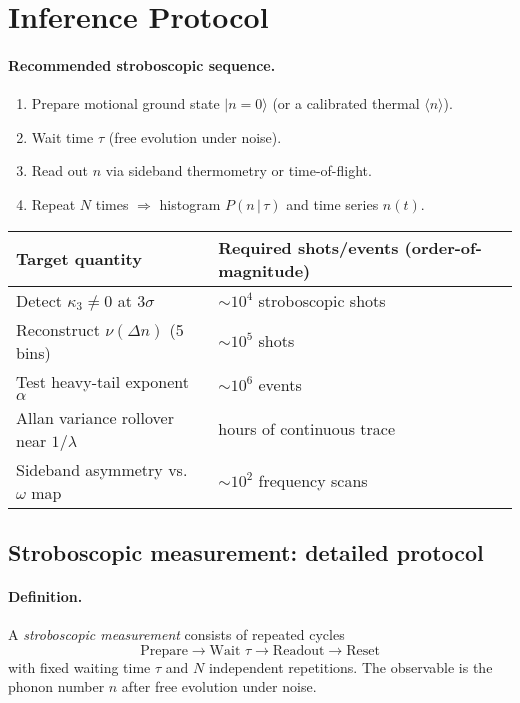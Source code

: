 \section{Inference Protocol}
\label{sec:inference-protocol}
\label{sec:inference_protocol}
\paragraph{Recommended stroboscopic sequence.}
\begin{enumerate}\itemsep0.2em
  \item Prepare motional ground state $\lvert n=0\rangle$ (or a calibrated thermal $\langle n\rangle$).
  \item Wait time $\tau$ (free evolution under noise).
  \item Read out $n$ via sideband thermometry or time-of-flight.
  \item Repeat $N$ times $\Rightarrow$ histogram $P(n\,|\,\tau)$ and time series $n(t)$.
\end{enumerate}

\begin{table}[h]
  \centering
  \renewcommand{\arraystretch}{1.15}
  \begin{tabularx}{0.9\textwidth}{>{\raggedright\arraybackslash}X>{\raggedleft\arraybackslash}p{4.2cm}}
    \hline
    \textbf{Target quantity} & \textbf{Required shots/events (order-of-magnitude)} \\
    \hline
    Detect $\kappa_3 \neq 0$ at $3\sigma$ & $\sim 10^4$ stroboscopic shots \\
    Reconstruct $\nu(\Delta n)$ (5 bins)  & $\sim 10^5$ shots \\
    Test heavy-tail exponent $\alpha$      & $\sim 10^6$ events \\
    Allan variance rollover near $1/\lambda$ & hours of continuous trace \\
    Sideband asymmetry vs.\ $\omega$ map   & $\sim 10^2$ frequency scans \\
    \hline
  \end{tabularx}
\end{table}

\subsection{Stroboscopic measurement: detailed protocol}
\paragraph{Definition.}
A \emph{stroboscopic measurement} consists of repeated cycles
\[
  \text{Prepare} \to \text{Wait } \tau \to \text{Readout} \to \text{Reset}
\]
with fixed waiting time $\tau$ and $N$ independent repetitions.
The observable is the phonon number $n$ after free evolution under noise.


